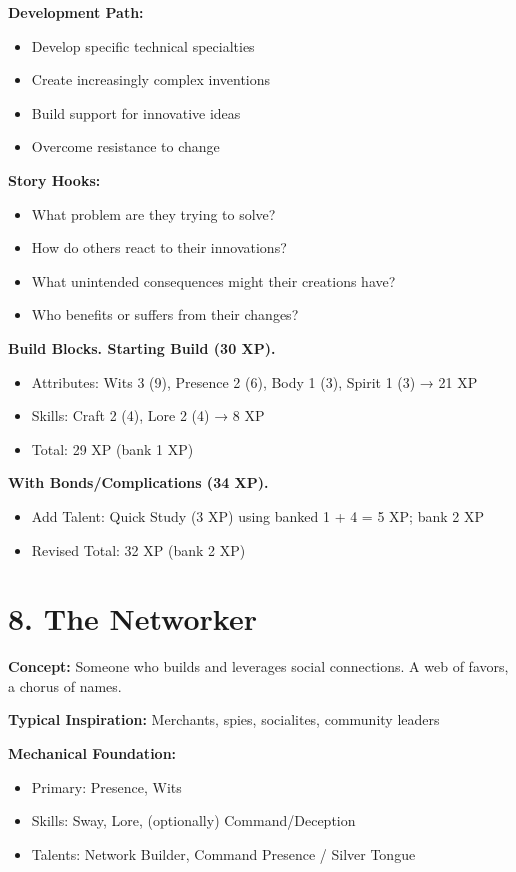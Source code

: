 \documentclass[11pt,twoside,openany]{book}
\begin{document}
\textbf{Development Path:}
\begin{itemize}
\item Develop specific technical specialties
\item Create increasingly complex inventions
\item Build support for innovative ideas
\item Overcome resistance to change
\end{itemize}

\textbf{Story Hooks:}
\begin{itemize}
\item What problem are they trying to solve?
\item How do others react to their innovations?
\item What unintended consequences might their creations have?
\item Who benefits or suffers from their changes?
\end{itemize}

\textbf{Build Blocks. Starting Build (30 XP).}
\begin{itemize}
\item Attributes: Wits 3 (9), Presence 2 (6), Body 1 (3), Spirit 1 (3) → 21 XP
\item Skills: Craft 2 (4), Lore 2 (4) → 8 XP
\item Total: 29 XP (bank 1 XP)
\end{itemize}

\textbf{With Bonds/Complications (34 XP).}
\begin{itemize}
\item Add Talent: Quick Study (3 XP) using banked 1 + 4 = 5 XP; bank 2 XP
\item Revised Total: 32 XP (bank 2 XP)
\end{itemize}

\section*{8. The Networker} 

\textbf{Concept:} Someone who builds and leverages social connections. A web of favors, a chorus of names.

\textbf{Typical Inspiration:} Merchants, spies, socialites, community leaders

\textbf{Mechanical Foundation:}
\begin{itemize}
\item Primary: Presence, Wits
\item Skills: Sway, Lore, (optionally) Command/Deception
\item Talents: Network Builder, Command Presence / Silver Tongue
\end{itemize}
\end{document}
